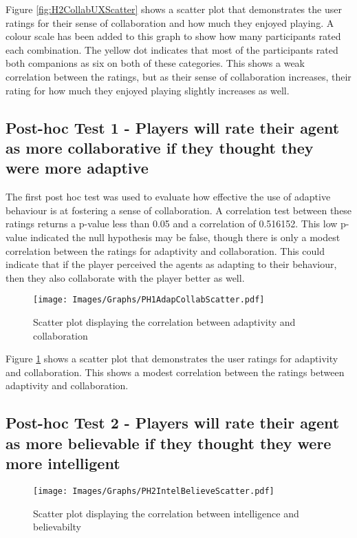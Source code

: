 \documentclass{IEEEtran}
\begin{document}
Figure \ref{fig:H2CollabUXScatter} shows a scatter plot that demonstrates the user ratings for their sense of collaboration and how much they enjoyed playing. A colour scale has been added to this graph to show how many participants rated each combination. The yellow dot indicates that most of the participants rated both companions as six on both of these categories. This shows a weak correlation between the ratings, but as their sense of collaboration increases, their rating for how much they enjoyed playing slightly increases as well.

\subsection{Post-hoc Test 1 - Players will rate their agent as more collaborative if they thought they were more adaptive}

The first post hoc test was used to evaluate how effective the use of adaptive behaviour is at fostering a sense of collaboration. A correlation test between these ratings returns a p-value less than 0.05 and a correlation of 0.516152. This low p-value indicated the null hypothesis may be false, though there is only a modest correlation between the ratings for adaptivity and collaboration. This could indicate that if the player perceived the agents as adapting to their behaviour, then they also collaborate with the player better as well.

\begin{figure}[!h]
  \centering
  \texttt{[image: Images/Graphs/PH1AdapCollabScatter.pdf]}
  
\caption{Scatter plot displaying the correlation between adaptivity and collaboration}
\label{fig:PH1AdapCollabScatter}
\end{figure}

Figure \ref{fig:PH1AdapCollabScatter} shows a scatter plot that demonstrates the user ratings for adaptivity and collaboration. This shows a modest correlation between the ratings between adaptivity and collaboration.

\subsection{Post-hoc Test 2 - Players will rate their agent as more believable if they thought they were more intelligent}

\begin{figure}[!h]
  \centering
  \texttt{[image: Images/Graphs/PH2IntelBelieveScatter.pdf]}
  
\caption{Scatter plot displaying the correlation between intelligence and believabilty}
\label{fig:PH2IntelBelieveScatter}
\end{figure}
\end{document}
